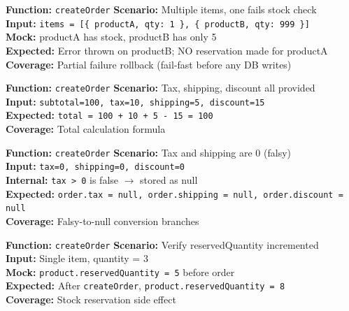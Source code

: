 ﻿\documentclass[12pt,a4paper]{report}
\newcommand{\ptwo}{\textbf{\color{p2orange}P2}}
\newcommand{\pthree}{\textbf{\color{p3blue}P3}}
\begin{document}
\begin{tcolorbox}[criticalbox,title={ORD-008 \hfill \ptwo\ --- Atomicity}]
\textbf{Function:} \texttt{createOrder} \quad \textbf{Scenario:} Multiple items, one fails stock check \\
\textbf{Input:} \texttt{items = [\{ productA, qty: 1 \}, \{ productB, qty: 999 \}]} \\
\textbf{Mock:} productA has stock, productB has only 5 \\
\textbf{Expected:} Error thrown on productB; NO reservation made for productA \\
\textbf{Coverage:} Partial failure rollback (fail-fast before any DB writes)
\end{tcolorbox}

\begin{tcolorbox}[testbox,title={ORD-009 \hfill \ptwo}]
\textbf{Function:} \texttt{createOrder} \quad \textbf{Scenario:} Tax, shipping, discount all provided \\
\textbf{Input:} \texttt{subtotal=100, tax=10, shipping=5, discount=15} \\
\textbf{Expected:} \texttt{total = 100 + 10 + 5 - 15 = 100} \\
\textbf{Coverage:} Total calculation formula
\end{tcolorbox}

\begin{tcolorbox}[testbox,title={ORD-010 \hfill \pthree}]
\textbf{Function:} \texttt{createOrder} \quad \textbf{Scenario:} Tax and shipping are 0 (falsy) \\
\textbf{Input:} \texttt{tax=0, shipping=0, discount=0} \\
\textbf{Internal:} \texttt{tax > 0} is false $\to$ stored as null \\
\textbf{Expected:} \texttt{order.tax = null, order.shipping = null, order.discount = null} \\
\textbf{Coverage:} Falsy-to-null conversion branches
\end{tcolorbox}

\begin{tcolorbox}[testbox,title={ORD-011 \hfill \ptwo}]
\textbf{Function:} \texttt{createOrder} \quad \textbf{Scenario:} Verify reservedQuantity incremented \\
\textbf{Input:} Single item, quantity = 3 \\
\textbf{Mock:} \texttt{product.reservedQuantity = 5} before order \\
\textbf{Expected:} After \texttt{createOrder}, \texttt{product.reservedQuantity = 8} \\
\textbf{Coverage:} Stock reservation side effect
\end{tcolorbox}
\end{document}
